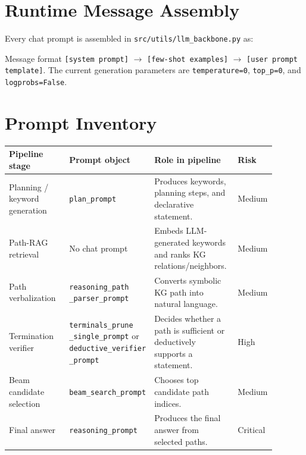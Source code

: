 \documentclass[10pt]{article}
\begin{document}
\section*{Runtime Message Assembly}

Every chat prompt is assembled in \texttt{src/utils/llm\_backbone.py} as:

\begin{promptbox}{Message format}
\small
\texttt{[system prompt]} $\rightarrow$ \texttt{[few-shot examples]} $\rightarrow$ \texttt{[user prompt template]}.
The current generation parameters are \texttt{temperature=0}, \texttt{top\_p=0}, and \texttt{logprobs=False}.
\end{promptbox}

\section*{Prompt Inventory}

\begin{table}[h]
\centering
\small
\begin{tabular}{p{0.24\linewidth}p{0.22\linewidth}p{0.32\linewidth}p{0.11\linewidth}}
\toprule
Pipeline stage & Prompt object & Role in pipeline & Risk \\
\midrule
Planning / keyword generation & \texttt{plan\_prompt} & Produces keywords, planning steps, and declarative statement. & Medium \\
Path-RAG retrieval & No chat prompt & Embeds LLM-generated keywords and ranks KG relations/neighbors. & Medium \\
Path verbalization & \shortstack[l]{\texttt{reasoning\_path}\\\texttt{\_parser\_prompt}} & Converts symbolic KG path into natural language. & Medium \\
Termination verifier & \shortstack[l]{\texttt{terminals\_prune}\\\texttt{\_single\_prompt} or\\\texttt{deductive\_verifier}\\\texttt{\_prompt}} & Decides whether a path is sufficient or deductively supports a statement. & High \\
Beam candidate selection & \texttt{beam\_search\_prompt} & Chooses top candidate path indices. & Medium \\
Final answer & \texttt{reasoning\_prompt} & Produces the final answer from selected paths. & Critical \\
\bottomrule
\end{tabular}
\end{table}
\end{document}
